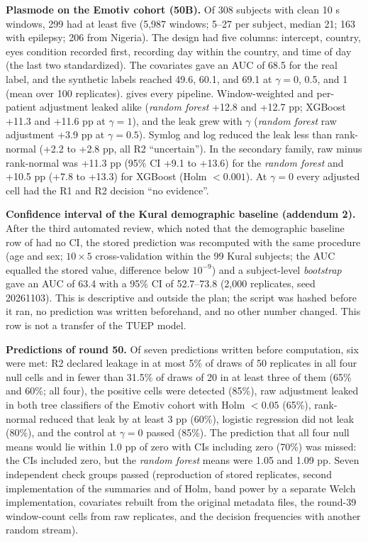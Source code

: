\textbf{Plasmode on the Emotiv cohort (50B).} Of 308 subjects with clean 10 s windows, 299 had at least five (5,987 windows; 5--27 per subject, median 21; 163 with epilepsy; 206 from Nigeria). The design had five columns: intercept, country, eyes condition recorded first, recording day within the country, and time of day (the last two standardized). The covariates gave an AUC of 68.5 for the real label, and the synthetic labels reached 49.6, 60.1, and 69.1 at $\gamma = 0$, 0.5, and 1 (mean over 100 replicates).  gives every pipeline. Window-weighted and per-patient adjustment leaked alike (\textit{random forest} +12.8 and +12.7 pp; XGBoost +11.3 and +11.6 pp at $\gamma=1$), and the leak grew with $\gamma$ (\textit{random forest} raw adjustment +3.9 pp at $\gamma=0.5$). Symlog and log reduced the leak less than rank-normal (+2.2 to +2.8 pp, all R2 ``uncertain''). In the secondary family, raw minus rank-normal was +11.3 pp (95\% CI +9.1 to +13.6) for the \textit{random forest} and +10.5 pp (+7.8 to +13.3) for XGBoost (Holm $<0.001$). At $\gamma=0$ every adjusted cell had the R1 and R2 decision ``no evidence''.


\textbf{Confidence interval of the Kural demographic baseline (addendum 2).} After the third automated review, which noted that the demographic baseline row of  had no CI, the stored prediction was recomputed with the same procedure (age and sex; $10\times5$ cross-validation within the 99 Kural subjects; the AUC equalled the stored value, difference below $10^{-9}$) and a subject-level \textit{bootstrap} gave an AUC of 63.4 with a 95\% CI of 52.7--73.8 (2,000 replicates, seed 20261103). This is descriptive and outside the plan; the script was hashed before it ran, no prediction was written beforehand, and no other number changed. This row is not a transfer of the TUEP model.

\textbf{Predictions of round 50.} Of seven predictions written before computation, six were met: R2 declared leakage in at most 5\% of draws of 50 replicates in all four null cells and in fewer than 31.5\% of draws of 20 in at least three of them (65\% and 60\%; all four), the positive cells were detected (85\%), raw adjustment leaked in both tree classifiers of the Emotiv cohort with Holm $<0.05$ (65\%), rank-normal reduced that leak by at least 3 pp (60\%), logistic regression did not leak (80\%), and the control at $\gamma=0$ passed (85\%). The prediction that all four null means would lie within 1.0 pp of zero with CIs including zero (70\%) was missed: the CIs included zero, but the \textit{random forest} means were 1.05 and 1.09 pp. Seven independent check groups passed (reproduction of stored replicates, second implementation of the summaries and of Holm, band power by a separate Welch implementation, covariates rebuilt from the original metadata files, the round-39 window-count cells from raw replicates, and the decision frequencies with another random stream).
